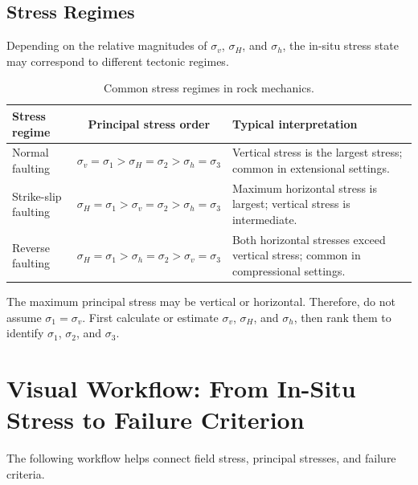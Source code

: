 \documentclass[a4paper,12pt]{article}
\begin{document}
\subsection{Stress Regimes}

Depending on the relative magnitudes of \(\sigma_v\), \(\sigma_H\), and \(\sigma_h\), the
in-situ stress state may correspond to different tectonic regimes.

\begin{table}[H]
\centering
\small
\begin{tabularx}{\textwidth}{l c Y}
\toprule
\textbf{Stress regime} & \textbf{Principal stress order} & \textbf{Typical interpretation} \\
\midrule
Normal faulting &
\(\sigma_v = \sigma_1 > \sigma_H = \sigma_2 > \sigma_h = \sigma_3\) &
Vertical stress is the largest stress; common in extensional settings. \\
\midrule
Strike-slip faulting &
\(\sigma_H = \sigma_1 > \sigma_v = \sigma_2 > \sigma_h = \sigma_3\) &
Maximum horizontal stress is largest; vertical stress is intermediate. \\
\midrule
Reverse faulting &
\(\sigma_H = \sigma_1 > \sigma_h = \sigma_2 > \sigma_v = \sigma_3\) &
Both horizontal stresses exceed vertical stress; common in compressional settings. \\
\bottomrule
\end{tabularx}
\caption{Common stress regimes in rock mechanics.}
\end{table}

\begin{keybox}
The maximum principal stress may be vertical or horizontal. Therefore, do not assume
\(\sigma_1=\sigma_v\). First calculate or estimate \(\sigma_v\), \(\sigma_H\), and \(\sigma_h\),
then rank them to identify \(\sigma_1\), \(\sigma_2\), and \(\sigma_3\).
\end{keybox}

\section{Visual Workflow: From In-Situ Stress to Failure Criterion}

The following workflow helps connect field stress, principal stresses, and failure criteria.
\end{document}
